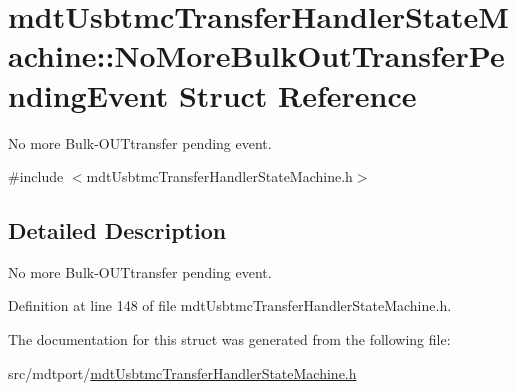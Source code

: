 \hypertarget{structmdt_usbtmc_transfer_handler_state_machine_1_1_no_more_bulk_out_transfer_pending_event}{\section{mdt\-Usbtmc\-Transfer\-Handler\-State\-Machine\-:\-:No\-More\-Bulk\-Out\-Transfer\-Pending\-Event Struct Reference}
\label{structmdt_usbtmc_transfer_handler_state_machine_1_1_no_more_bulk_out_transfer_pending_event}
}


No more Bulk-\/\-O\-U\-Ttransfer pending event.  




{\ttfamily \#include $<$mdt\-Usbtmc\-Transfer\-Handler\-State\-Machine.\-h$>$}



\subsection{Detailed Description}
No more Bulk-\/\-O\-U\-Ttransfer pending event. 

Definition at line 148 of file mdt\-Usbtmc\-Transfer\-Handler\-State\-Machine.\-h.



The documentation for this struct was generated from the following file\-:\begin{DoxyCompactItemize}
\item 
src/mdtport/\hyperlink{mdt_usbtmc_transfer_handler_state_machine_8h}{mdt\-Usbtmc\-Transfer\-Handler\-State\-Machine.\-h}\end{DoxyCompactItemize}
